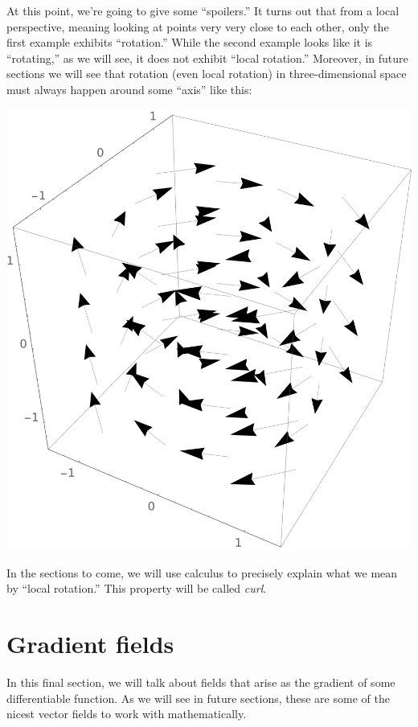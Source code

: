 \documentclass{ximera}
\begin{document}
At this point, we're going to give some ``spoilers.'' It turns out
that from a local perspective, meaning looking at points very very
close to each other, only the first example exhibits ``rotation.''
While the second example looks like it is ``rotating,'' as we will
see, it does not exhibit ``local rotation.''  Moreover, in future
sections we will see that rotation (even local rotation) in
three-dimensional space must always happen around some ``axis'' like
this:
  \begin{image}
    \includegraphics{rotField3.png}
  \end{image}
In the sections to come, we will use calculus to precisely explain
what we mean by ``local rotation.'' This property will be called
\textit{curl}.





\section{Gradient fields}

In this final section, we will talk about fields that arise as the
gradient of some differentiable function.  As we will see in future
sections, these are some of the nicest vector fields to work with
mathematically.
\end{document}
